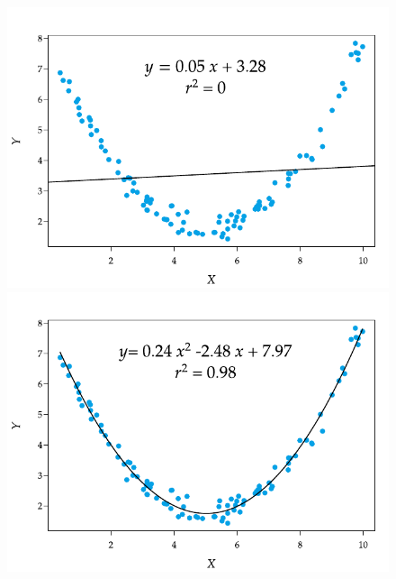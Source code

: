 \documentclass[
  a4paper,
]{scrreport}
\theoremstyle{plain}
\theoremstyle{definition}
\theoremstyle{definition}
\theoremstyle{remark}
\begin{document}
\begin{figure}

\begin{minipage}{0.50\linewidth}

\includegraphics{img/regresion/regresion_lineal_relacion_cuadratica.pdf}

\end{minipage}%
%
\begin{minipage}{0.50\linewidth}

\includegraphics{img/regresion/regresion_cuadratica.pdf}

\end{minipage}%

\end{figure}%
\end{document}
